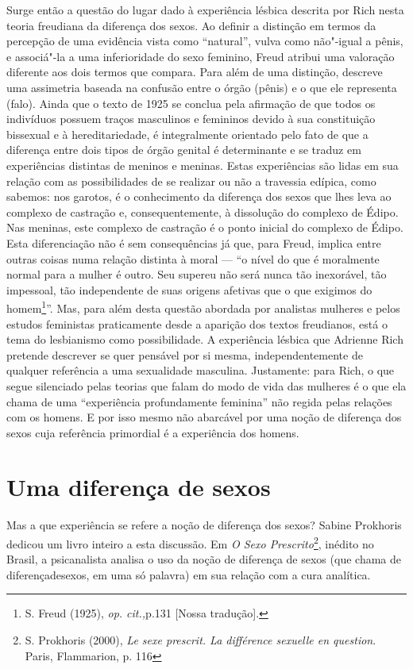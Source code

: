 Surge então a questão do lugar dado à experiência lésbica descrita por
Rich nesta teoria freudiana da diferença dos sexos. Ao definir a
distinção em termos da percepção de uma evidência vista como
``natural'', vulva como não"-igual a pênis, e associá"-la a uma
inferioridade do sexo feminino, Freud atribui uma valoração diferente
aos dois termos que compara. Para além de uma distinção, descreve uma
assimetria baseada na confusão entre o órgão (pênis) e o que ele
representa (falo). Ainda que o texto de 1925 se conclua pela afirmação
de que todos os indivíduos possuem traços masculinos e femininos devido
à sua constituição bissexual e à hereditariedade, é integralmente
orientado pelo fato de que a diferença entre dois tipos de órgão genital
é determinante e se traduz em experiências distintas de meninos e
meninas. Estas experiências são lidas em sua relação com as
possibilidades de se realizar ou não a travessia edípica, como sabemos:
nos garotos, é o conhecimento da diferença dos sexos que lhes leva ao
complexo de castração e, consequentemente, à dissolução do complexo de
Édipo. Nas meninas, este complexo de castração é o ponto inicial do
complexo de Édipo. Esta diferenciação não é sem consequências já que,
para Freud, implica entre outras coisas numa relação distinta à moral ---
``o nível do que é moralmente normal para a mulher é outro. Seu supereu
não será nunca tão inexorável, tão impessoal, tão independente de suas
origens afetivas que o que exigimos do homem\footnote{S. Freud (1925),
  \emph{op. cit.,}p.131 {[}Nossa tradução{]}.}''. Mas, para além desta
questão abordada por analistas mulheres e pelos estudos feministas
praticamente desde a aparição dos textos freudianos, está o tema do
lesbianismo como possibilidade. A experiência lésbica que Adrienne Rich
pretende descrever se quer pensável por si mesma, independentemente de
qualquer referência a uma sexualidade masculina. Justamente: para Rich,
o que segue silenciado pelas teorias que falam do modo de vida das
mulheres é o que ela chama de uma ``experiência profundamente feminina''
não regida pelas relações com os homens. E por isso mesmo não abarcável
por uma noção de diferença dos sexos cuja referência primordial é a
experiência dos homens.

\section{Uma diferença de sexos}

Mas a que experiência se refere a noção de diferença dos sexos? Sabine
Prokhoris dedicou um livro inteiro a esta discussão. Em \emph{O Sexo
Prescrito}\footnote{S. Prokhoris (2000), \emph{Le sexe prescrit. La
  différence sexuelle en question}. Paris, Flammarion, p. 116}, inédito
no Brasil, a psicanalista analisa o uso da noção de diferença de sexos
(que chama de diferençadesexos, em uma só palavra) em sua relação com a
cura analítica.

